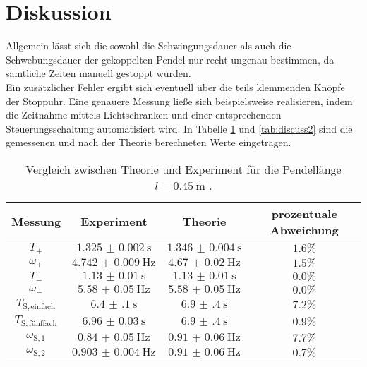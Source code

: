 \section{Diskussion}
\label{sec:Diskussion}
Allgemein lässt sich die sowohl die Schwingungsdauer als auch die Schwebungsdauer der gekoppelten Pendel nur recht ungenau bestimmen, da sämtliche Zeiten manuell gestoppt wurden.\\
Ein zusätzlicher Fehler ergibt sich eventuell über die teils klemmenden Knöpfe der Stoppuhr.
Eine genauere Messung ließe sich beispielsweise realisieren, indem die Zeitnahme mittels Lichtschranken und einer entsprechenden Steuerungsschaltung automatisiert wird.
In Tabelle \ref{tab:discuss} und \ref{tab:discuss2} sind die gemessenen und nach der Theorie
berechneten Werte eingetragen.

\begin{table}
	\caption{Vergleich zwischen Theorie und Experiment für die Pendellänge $l=\SI{0.45}{\meter}$ .}
	\label{tab:discuss}
	\begin{tabular}{cccc}
		\toprule
		Messung                    & Experiment               & Theorie                  & prozentuale Abweichung \\
		\midrule
		$T_{\mathrm{+}}$           & $\SI{1.325(2)}{\second}$ & $\SI{1.346(4)}{\second}$ & $1.6\%$                \\
		$\omega_{\mathrm{+}}$      & $\SI{4.742(9)}{\Hz}$     & $\SI{4.67(2)}{\Hz}$      & $1.5\%$                \\
		$T_{\mathrm{-}}$           & $\SI{1.13(1)}{\second}$  & $\SI{1.13(1)}{\second}$  & $0.0\% $               \\
		$\omega_{\mathrm{-}}$      & $\SI{5.58(5)}{\Hz}$      & $\SI{5.58(5)}{\Hz}$      & $0.0\%$                \\
		$T_{\mathrm{S,einfach}}$   & $\SI{6.4(1)}{\second}$   & $\SI{6.9(4)}{\second}$   & $7.2\%$                \\
		$T_{\mathrm{S,fünffach}}$ & $\SI{6.96(3)}{\second}$  & $\SI{6.9(4)}{\second}$   & $0.9\%$                \\
		$\omega_{\mathrm{S,1}}$    & $\SI{0.84(5)}{\Hz}$      & $\SI{0.91(6)}{\Hz}$      & $7.7\%$                \\
		$\omega_{\mathrm{S,2}}$    & $\SI{0.903(4)}{\Hz}$     & $\SI{0.91(6)}{\Hz}$      & $0.7\%$                \\
		\bottomrule
	\end{tabular}
\end{table}

